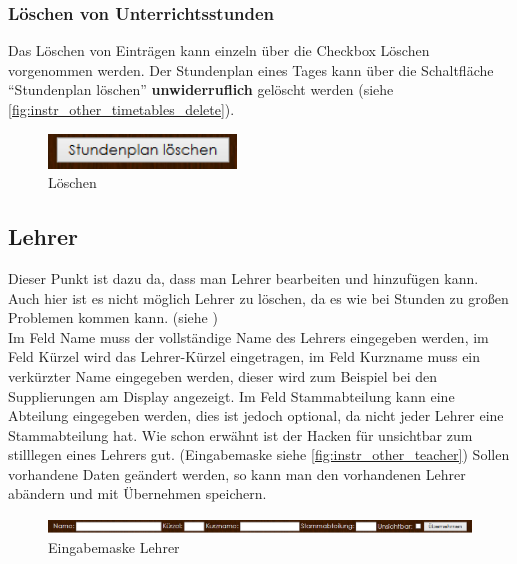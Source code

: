 \subsubsection{Löschen von Unterrichtsstunden}
Das Löschen von Einträgen kann einzeln über die Checkbox Löschen vorgenommen werden. Der Stundenplan eines Tages kann über die Schaltfläche \enquote{Stundenplan löschen} \textbf{unwiderruflich} gelöscht werden (siehe \autoref{fig:instr_other_timetables_delete}).
\begin{figure}[H]
\centering
\includegraphics[keepaspectratio=true, width=5cm]{images/screenshots/timetables_input_delete.png}
\caption{Löschen}
\label{fig:instr_other_timetables_delete}
\end{figure}
\subsection{Lehrer}
Dieser Punkt ist dazu da, dass man Lehrer bearbeiten und hinzufügen kann. Auch hier ist es nicht möglich Lehrer zu löschen, da es wie bei Stunden zu großen Problemen kommen kann. (siehe )\\
Im Feld Name muss der vollständige Name des Lehrers eingegeben werden, im Feld Kürzel wird das Lehrer-Kürzel eingetragen, im Feld Kurzname muss ein verkürzter Name eingegeben werden, dieser wird zum Beispiel bei den Supplierungen am Display angezeigt. Im Feld Stammabteilung kann eine Abteilung eingegeben werden, dies ist jedoch optional, da nicht jeder Lehrer eine Stammabteilung hat. Wie schon erwähnt ist der Hacken für unsichtbar zum stilllegen eines Lehrers gut. (Eingabemaske siehe \autoref{fig:instr_other_teacher}) Sollen vorhandene Daten geändert werden, so kann man den vorhandenen Lehrer abändern und mit Übernehmen speichern.
\begin{figure}[H]
\centering
\includegraphics[keepaspectratio=true, width=17cm]{images/screenshots/teachers_input.png}
\caption{Eingabemaske Lehrer}
\label{fig:instr_other_teacher}
\end{figure}
